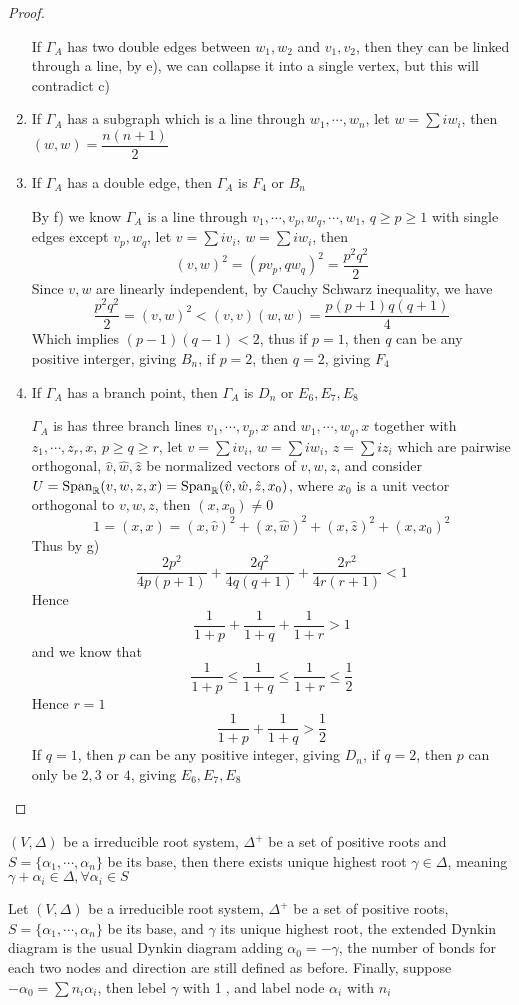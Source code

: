 \documentclass[main]{subfiles}
\begin{document}
\begin{proof}
\begin{enumerate}[leftmargin=*,label=\textbf{\alph*)}]
If $\Gamma_A$ has two double edges between $w_1,w_2$ and $v_1,v_2$, then they can be linked through a line, by e), we can collapse it into a single vertex, but this will contradict c)
\item If $\Gamma_A$ has a subgraph which is a line through $w_1,\cdots,w_n$, let $w=\sum iw_i$, then $(w,w)=\dfrac{n(n+1)}{2}$
\item If $\Gamma_A$ has a double edge, then $\Gamma_A$ is $F_4$ or $B_n$ \par
By f) we know $\Gamma_A$ is a line through $v_1,\cdots,v_p,w_q,\cdots,w_1$, $q\geq p\geq1$ with single edges except $v_p,w_q$, let $v=\sum iv_i$, $w=\sum iw_i$, then
\[(v,w)^2=(pv_p,qw_q)^2=\frac{p^2q^2}{2}\]
Since $v,w$ are linearly independent, by Cauchy Schwarz inequality, we have
\[\frac{p^2q^2}{2}=(v,w)^2<(v,v)(w,w)=\frac{p(p+1)q(q+1)}{4}\]
Which implies $(p-1)(q-1)<2$, thus if $p=1$, then $q$ can be any positive interger, giving $B_n$, if $p=2$, then $q=2$, giving $F_4$
\item If $\Gamma_A$ has a branch point, then $\Gamma_A$ is $D_n$ or $E_6,E_7,E_8$ \par
$\Gamma_A$ is has three branch lines $v_1,\cdots,v_p,x$ and $w_1,\cdots,w_q,x$ together with $z_1,\cdots,z_r,x$, $p\geq q\geq r$, let $v=\sum iv_i$, $w=\sum iw_i$, $z=\sum iz_i$ which are pairwise orthogonal, $\hat v,\hat w,\hat z$ be normalized vectors of $v,w,z$, and consider $U=\operatorname{Span}_{\mathbb R}(v,w,z,x)=\operatorname{Span}_{\mathbb R}(\hat v,\hat w,\hat z,x_0)$, where $x_0$ is a unit vector orthogonal to $v,w,z$, then $(x,x_0)\neq0$
\[1=(x,x)=(x,\hat v)^2+(x,\hat w)^2+(x,\hat z)^2+(x,x_0)^2\]
Thus by g)
\[\frac{2p^2}{4p(p+1)}+\frac{2q^2}{4q(q+1)}+\frac{2r^2}{4r(r+1)}<1\]
Hence
\[\frac{1}{1+p}+\frac{1}{1+q}+\frac{1}{1+r}>1\]
and we know that
\[\frac{1}{1+p}\leq\frac{1}{1+q}\leq\frac{1}{1+r}\leq\frac{1}{2}\]
Hence $r=1$
\[\frac{1}{1+p}+\frac{1}{1+q}>\frac{1}{2}\]
If $q=1$, then $p$ can be any positive integer, giving $D_n$, if $q=2$, then $p$ can only be $2,3$ or $4$, giving $E_6,E_7,E_8$
\end{enumerate}
\end{proof}

\begin{lemma}
$(V,\Delta)$ be a irreducible root system, $\Delta^+$ be a set of positive roots and $S=\{\alpha_1,\cdots,\alpha_n\}$ be its base, then there exists unique highest root $\gamma\in\Delta$, meaning $\gamma+\alpha_i\in\Delta,\forall\alpha_i\in S$
\end{lemma}

\begin{definition}
Let $(V,\Delta)$ be a irreducible root system, $\Delta^+$ be a set of positive roots, $S=\{\alpha_1,\cdots,\alpha_n\}$ be its base, and $\gamma$ its unique highest root, the extended Dynkin diagram is the usual Dynkin diagram adding $\alpha_0=-\gamma$, the number of bonds for each two nodes and direction are still defined as before. Finally, suppose $-\alpha_0=\sum n_i\alpha_i$, then lebel $\gamma$ with \textcircled{\small 1}, and label node $\alpha_i$ with $n_i$
\end{definition}
\end{document}
